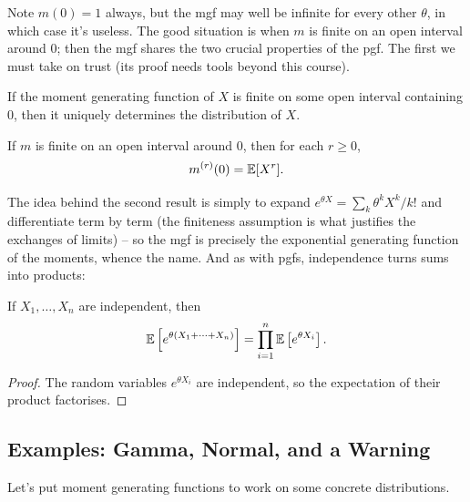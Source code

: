 \documentclass[a4paper]{scrartcl}
\begin{document}
Note $m(0) = 1$ always, but the mgf may well be infinite for every other $\theta$, in which case it's useless. The good situation is when $m$ is finite on an open interval around $0$; then the mgf shares the two crucial properties of the pgf. The first we must take on trust (its proof needs tools beyond this course).

\begin{theorem}[Uniqueness]
	If the moment generating function of $X$ is finite on some open interval containing $0$, then it uniquely determines the distribution of $X$.
\end{theorem}

\begin{theorem}
	If $m$ is finite on an open interval around $0$, then for each $r \geq 0$,
	$$
	m^{(r)}(0) = \mathbb{E}[X^r].
	$$
\end{theorem}

The idea behind the second result is simply to expand $e^{\theta X} = \sum_k \theta^k X^k / k!$ and differentiate term by term (the finiteness assumption is what justifies the exchanges of limits) -- so the mgf is precisely the exponential generating function of the moments, whence the name. And as with pgfs, independence turns sums into products:

\begin{theorem}
	If $X_1, \dots, X_n$ are independent, then
	$$
	\mathbb{E}\left[e^{\theta(X_1 + \cdots + X_n)}\right] = \prod_{i = 1}^{n} \mathbb{E}\left[e^{\theta X_i}\right].
	$$
\end{theorem}
\begin{proof}
	The random variables $e^{\theta X_i}$ are independent, so the expectation of their product factorises.
\end{proof}

\subsection{Examples: Gamma, Normal, and a Warning}

Let's put moment generating functions to work on some concrete distributions.
\end{document}
